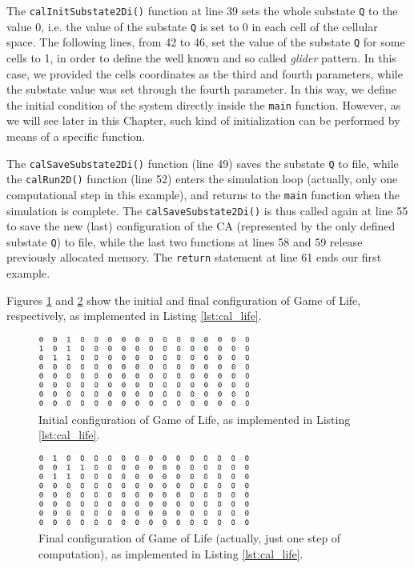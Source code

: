 The \verb'calInitSubstate2Di()' function at line 39 sets the whole
substate \verb'Q' to the value 0, i.e. the value of the substate
\verb'Q' is set to 0 in each cell of the cellular space. The following
lines, from 42 to 46, set the value of the substate \verb'Q' for some
cells to 1, in order to define the well known and so called
\emph{glider} pattern. In this case, we provided the cells coordinates
as the third and fourth parameters, while the substate value was set
through the fourth parameter. In this way, we define the initial
condition of the system directly inside the \verb'main'
function. However, as we will see later in this Chapter, such kind of
initialization can be performed by means of a specific function.

The \verb'calSaveSubstate2Di()' function (line 49) saves the substate
\verb'Q' to file, while the \verb'calRun2D()' function (line 52)
enters the simulation loop (actually, only one computational step in
this example), and returns to the \verb'main' function when the
simulation is complete. The \verb'calSaveSubstate2Di()' is thus called
again at line 55 to save the new (last) configuration of the CA
(represented by the only defined substate \verb'Q') to file, while the
last two functions at lines 58 and 59 release previously allocated
memory. The \verb'return' statement at line 61 ends our first example.

Figures \ref{fig:life_0000} and \ref{fig:life_LAST} show the initial
and final configuration of Game of Life, respectively, as implemented
in Listing \ref{lst:cal_life}.

\begin{figure}
  \begin{center}
    \includegraphics[width=7cm]{./images/OpenCAL/life_0000}
    \caption{Initial configuration of Game of Life, as implemented in Listing \ref{lst:cal_life}.}
    \label{fig:life_0000}
  \end{center}
\end{figure}

\begin{figure}
  \begin{center}
    \includegraphics[width=7cm]{./images/OpenCAL/life_LAST}
    \caption{Final configuration of Game of Life (actually, just one step of computation), as implemented in Listing \ref{lst:cal_life}.}
    \label{fig:life_LAST}
  \end{center}
\end{figure}



